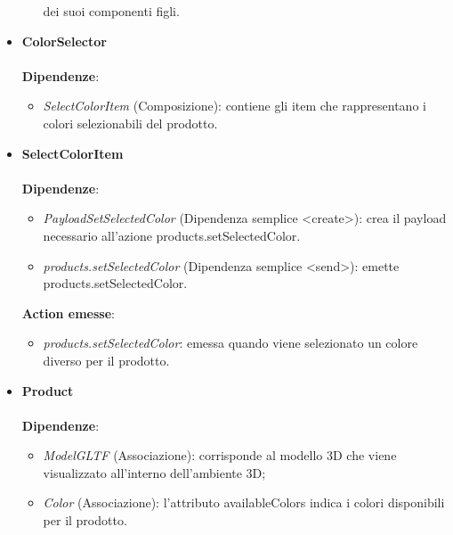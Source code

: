 \begin{itemize}
\begin{itemize}
			dei suoi componenti figli.
		\end{itemize}
		\item \textbf{ColorSelector}
		\\\\
		\textbf{Dipendenze}:
		\begin{itemize}
			\item \textit{SelectColorItem} (Composizione): contiene gli item che rappresentano i colori selezionabili del prodotto.
		\end{itemize}
		\item \textbf{SelectColorItem}
		\\\\
		\textbf{Dipendenze}:
		\begin{itemize}
			\item \textit{PayloadSetSelectedColor} (Dipendenza semplice \textless create\textgreater): crea il payload necessario all'azione products.setSelectedColor.
			\item \textit{products.setSelectedColor} (Dipendenza semplice \textless send\textgreater): emette products.setSelectedColor.
		\end{itemize}
		\textbf{Action emesse}:
		\begin{itemize}
			\item \textit{products.setSelectedColor}: emessa quando viene selezionato un colore diverso per il prodotto.
		\end{itemize}
		\item \textbf{Product}
		\\\\
		\textbf{Dipendenze}:
		\begin{itemize}
			\item \textit{ModelGLTF} (Associazione): corrisponde al modello 3D che viene visualizzato all'interno dell'ambiente 3D;
			\item \textit{Color} (Associazione): l'attributo availableColors indica i colori disponibili per il prodotto.
		\end{itemize}
\end{itemize}
